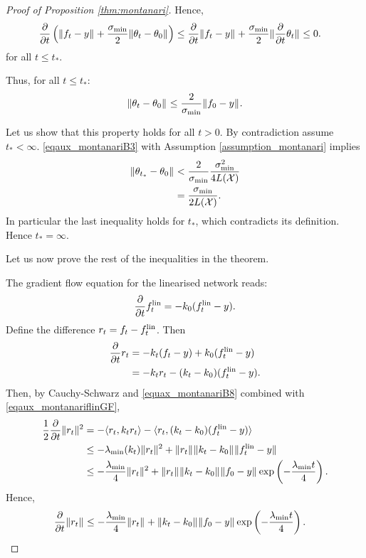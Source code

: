 \documentclass{article}
\theoremstyle{definition}
\theoremstyle{remark}
\numberwithin{equation}{section}
\newcommand{\X}{\mathcal{X}}
\newcommand{\lin}{{\textup{lin}}}
\newcommand{\lammin}{\lambda_{\textup{min}}}
\newcommand{\sigmin}{\sigma_{\textup{min}}}
\newcommand{\norm}[2]{
    \|#1\|_{#2}
}
\newcommand{\partv}[1]{
    \frac{\partial}{\partial #1}
}
\begin{document}
\begin{proof}[Proof of Proposition \ref{thm:montanari}]
Hence,
\begin{align}
    \label{eqaux_montanari_preB3}
    \partv{t}\left(\norm{f_t-y}{}+ \frac{\sigmin}{2}\norm{\theta_t-\theta_0}{}\right) &\le\partv{t}\norm{f_t-y}{}+\frac{\sigmin}{2}\norm{\frac{\partial}{\partial t} \theta_t}{}
    \le 0.
\end{align}
for all $t \le t_*$.

Thus, for all $t \le t_*$:
\begin{align}
    \label{eqaux_montanariB3}
    \norm{\theta_t-\theta_0}{} \le \frac{2}{\sigmin}\norm{f_0-y}{}.
\end{align}
    
    Let us show that this property holds for all $t>0$.
    By contradiction assume $t_* < \infty$.
    \eqref{eqaux_montanariB3} with Assumption \ref{assumption_montanari} implies
    \begin{align}
    	\norm{\theta_{t_*}-\theta_0}{} &< \frac{2}{\sigmin}\frac{\sigmin^2}{4L(\X)}\\
    	&= \frac{\sigmin}{2L(\X)}.
    \end{align}
    In particular the last inequality holds for $t_*$, which contradicts its definition.
    Hence $t_* = \infty$.
     
Let us now prove the rest of the inequalities in the theorem.

    The gradient flow equation for the linearised network reads:
    \begin{align}
        \label{eqaux_montanariflinGF}
     	\frac{\partial}{\partial t} {f^\lin_t}=-k_0(f^\lin_t - y).
     \end{align}
     Define the difference $r_t=f_t-f^\lin_t$.
     Then 
     \begin{align}
		\frac{\partial}{\partial t} {r_t}&=-k_t(f_t-y)+k_0(f^\lin_t-y)\\
		&= -k_tr_t - (k_t-k_0)(f^\lin_t - y).
	\end{align}     
         Then, by Cauchy-Schwarz and \eqref{equax_montanariB8} combined with \eqref{eqaux_montanariflinGF},
         \begin{align}
         	\frac{1}{2}\frac{\partial}{\partial t}\norm{r_t}{}^2 &= -\langle r_t, k_tr_t\rangle -\langle r_t, (k_t-k_0)(f^\lin_t-y)\rangle\\
         	&\le -\lammin(k_t)\norm{r_t}{}^2 +\norm{r_t}{}\norm{k_t-k_0}{}\norm{f^\lin_t-y}{}\\
         	&\le  -\frac{\lammin}{4}\norm{r_t}{}^2 +\norm{r_t}{}\norm{k_t-k_0}{}\norm{f_0-y}{}\exp\left(-\frac{\lammin t}{4}\right). 
         \end{align}
         Hence,
         \begin{align}
         	\frac{\partial}{\partial t}\norm{r_t}{} &\le  -\frac{\lammin}{4}\norm{r_t}{} +\norm{k_t-k_0}{}\norm{f_0-y}{}\exp\left(-\frac{\lammin t}{4}\right).
         \end{align}
         

\end{proof}
\end{document}
